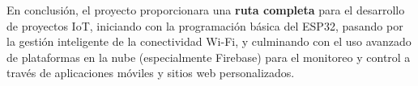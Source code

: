 \documentclass{article}
\begin{document}
En conclusión, el proyecto proporcionara una \textbf{ruta completa} para 
el desarrollo de proyectos IoT, iniciando con la programación 
básica del ESP32, pasando por la gestión inteligente de la conectividad 
Wi-Fi, y culminando con el uso avanzado de plataformas en la nube 
(especialmente Firebase) para el monitoreo y control a través de 
aplicaciones móviles y sitios web personalizados.
\end{document}
